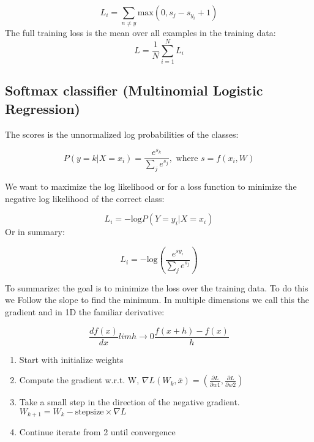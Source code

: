 \begin{equation}
L_i = \sum_{n \neq y} \text{max}(0,s_j-s_{y_i} +1)  
\end{equation}
The full training loss is the mean over all examples in the training data:
\begin{equation}
L = \frac{1} {N} \sum_{i=1}^{N} L_i
\end{equation}

\subsection*{Softmax classifier (Multinomial Logistic Regression)}
The scores is the unnormalized log probabilities of the classes:

\begin{equation}
P(y=k |X=x_i) = \frac{e^{s_k}} {\sum_{j}e^{s_j}}, \text{ where } s = f(x_i,W) 
\end{equation}

We want to maximize the log likelihood or for a loss function to minimize the negative log likelihood of the correct class:

\begin{equation}
L_i = - \text{log} P(Y=y_i|X=x_i)
\end{equation}
Or in summary:

\begin{equation}
L_i = -\text{log}(\frac{e^{sy_i}} {\sum_{j}^{}e^{s_j}})
\end{equation}

To summarize: the goal is to minimize the loss over the training data. To do this we Follow the slope to find the minimum. In multiple dimensions we call this the gradient and in 1D the familiar derivative:


\begin{equation}
\frac{df(x)} {dx} lim h \rightarrow 0 \frac{f(x+h)-f(x)} {h} 
\end{equation}


\begin{enumerate}
	\item Start with initialize weights
	\item Compute the gradient w.r.t. W, $\nabla L(W_k,\overline{x}) = (\frac{\partial L} {\partial w1}, \frac{\partial L} {\partial w2})$ 
	\item Take a small step in the direction of the negative gradient. $W_{k+1} = W_k - \text{stepsize} \times \nabla L$
	\item Continue iterate from 2 until convergence
\end{enumerate}

